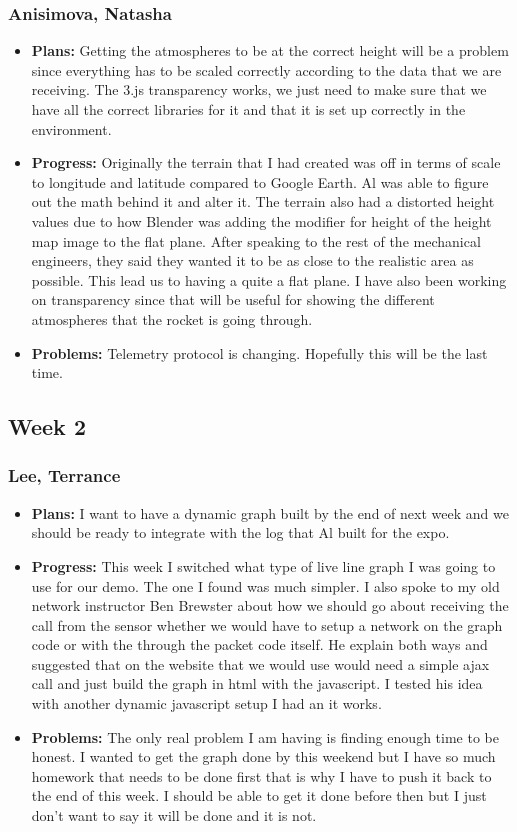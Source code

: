 \documentclass[10pt,draftclsnofoot,onecolumn]{IEEEtran}
\begin{document}
\subsubsection{Anisimova, Natasha}
\begin{itemize}
	\item \textbf{Plans: }Getting the atmospheres to be at the correct height will be a problem since everything has to be scaled correctly according to the data that we are receiving. The 3.js transparency works, we just need to make sure that we have all the correct libraries for it and that it is set up correctly in the environment.
	\item \textbf{Progress:} Originally the terrain that I had created was off in terms of scale to longitude and latitude compared to Google Earth. Al was able to figure out the math behind it and alter it. The terrain also had a distorted height values due to how Blender was adding the modifier for height of the height map image to the flat plane. After speaking to the rest of the mechanical engineers, they said they wanted it to be as close to the realistic area as possible. This lead us to having a quite a flat plane. I have also been working on transparency since that will be useful for showing the different atmospheres that the rocket is going through.
	\item \textbf{Problems: }
	Telemetry protocol is changing. Hopefully this will be the last time.


\end{itemize}

\subsection{Week 2}
\subsubsection{Lee, Terrance}
\begin{itemize}
	\item \textbf{Plans: }
	I want to have a dynamic graph built by the end of next week and we should be ready to integrate with the log that Al built for the expo.
	\item \textbf{Progress:  }
	This week I switched what type of live line graph I was going to use for our demo. The one I found was much simpler. I also spoke to my old network instructor Ben Brewster about how we should go about receiving the call from the sensor whether we would have to setup a network on the graph code or with the through the packet code itself. He explain both ways and suggested that on the website that we would use would need a simple ajax call and just build the graph in html with the javascript. I tested his idea with another dynamic javascript setup I had an it works.
	\item \textbf{Problems: }
	The only real problem I am having is finding enough time to be honest. I wanted to get the graph done by this weekend but I have so much homework that needs to be done first that is why I have to push it back to the end of this week. I should be able to get it done before then but I just don't want to say it will be done and it is not.
\end{itemize}
\end{document}
